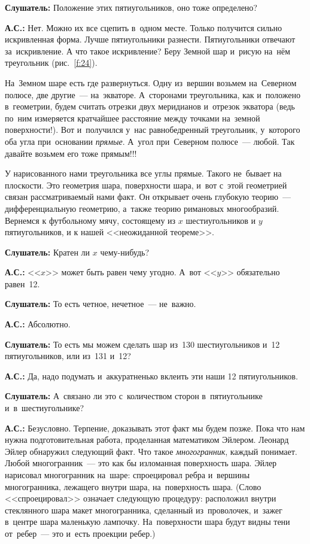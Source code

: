 \textbf{Слушатель:} Положение этих пятиугольников, оно тоже определено?

\textbf{А.С.:} Нет. Можно их все сцепить в~одном месте. Только получится сильно искривленная форма.
Лучше пятиугольники разнести. Пятиугольники отвечают за~искривление. А что такое искривление?
Беру Земной шар и~рисую на~нём треугольник (рис.~\ref{f:24}).


На~Земном шаре есть где развернуться. Одну из~вершин возьмем на~Северном полюсе, две другие~---
на~экваторе. А~сторонами треугольника, как и~положено в~геометрии, будем считать отрезки двух
меридианов и~отрезок экватора (ведь по~ним измеряется кратчайшее расстояние между точками на~земной
поверхности!). Вот и~получился у~нас равнобедренный треугольник, у~которого оба угла при~основании
\textit{прямые}. А~угол при~Северном полюсе~--- любой. Так давайте возьмем его тоже прямым!!!

У нарисованного нами треугольника все углы прямые. Такого не~бывает на плоскости. Это геометрия
шара, поверхности шара, и~вот с~этой геометрией связан рассматриваемый нами факт. Он открывает
очень глубокую теорию~--- дифференциальную гео\-мет\-рию, а~также теорию римановых многообразий.
Вернемся к футбольному мячу, состоящему из $x$ шестиугольников и $y$ пятиугольников, и к нашей <<неожиданной теореме>>.


\textbf{Слушатель:} Кратен ли $x$ чему-нибудь?

\textbf{А.С.:} <<$x$>> может быть равен чему угодно. А~вот <<$y$>> обязательно равен~12.

\textbf{Слушатель:} То есть четное, нечетное~--- не~важно.

\textbf{А.С.:} Абсолютно.

\textbf{Слушатель:} То есть мы можем сделать шар из~130 шестиугольников и~12 пятиугольников, или из~131 и~12?

\textbf{А.С.:} Да, надо подумать и~аккуратненько вклеить эти наши 12 пятиугольников.

\textbf{Слушатель:} А~связано ли это с~количеством сторон в~пятиугольнике и~в~шестиугольнике?


\pagebreak

\textbf{А.С.:} Безусловно. Терпение, доказывать этот факт мы будем позже. Пока что нам нужна подготовительная работа, проделанная математиком Эйлером.  Леонард Эйлер обнаружил следующий факт. Что
такое \textit{многогранник}, каждый понимает. Любой многогранник~--- это как бы изломанная поверхность шара.
Эйлер нарисовал многогранник на~шаре: спроецировал ребра и~вершины многогранника, лежащего внутри
шара, на~поверхность шара. (Слово <<спроецировал>> означает следующую
процедуру: расположил внутри стеклянного шара макет многогранника, сделанный из~проволочек, и~зажег
в~центре шара маленькую лампочку. На~поверхности шара будут видны тени от~ребер~--- это и~есть
проекции ребер.)

